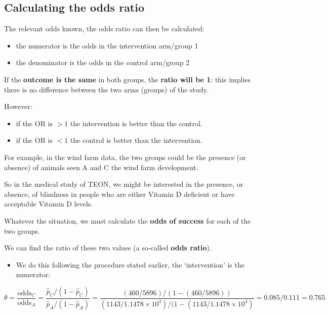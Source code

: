 \documentclass[
  oneside]{krantz}
\providecommand{\tightlist}{%
  \setlength{\itemsep}{0pt}\setlength{\parskip}{0pt}}
\begin{document}
\hypertarget{calculating-the-odds-ratio}{%
\subsection{Calculating the odds ratio}\label{calculating-the-odds-ratio}}

The relevant odds known, the odds ratio can then be calculated:

\begin{itemize}
\item
  the numerator is the odds in the intervention arm/group 1
\item
  the denominator is the odds in the control arm/group 2
\end{itemize}

If the \textbf{outcome is the same} in both groups, the \textbf{ratio will be 1}: this implies there is no difference between the two arms (groups) of the study.

However:

\begin{itemize}
\item
  if the OR is \(> 1\) the intervention is better than the control.
\item
  if the OR is \(< 1\) the control is better than the intervention.
\end{itemize}

For example, in the wind farm data, the two groups could be the presence (or absence) of animals seen A and C the wind farm development.

So in the medical study of TEON, we might be interested in the presence, or absence, of blindness in people who are either Vitamin D deficient or have acceptable Vitamin D levels.

Whatever the situation, we must calculate the \textbf{odds of success} for each of the two groups.

We can find the ratio of these two values (a so-called \textbf{odds ratio}).

\begin{itemize}
\tightlist
\item
  We do this following the procedure stated earlier, the `intervention' is the numerator:
\end{itemize}

\[\theta=\frac{\text{odds}_C}{\text{odds}_A}=\frac{\hat{p}_C/(1-\hat{p}_C)}{\hat{p}_A/(1-\hat{p}_A)}=\frac{(460 / 5896) / (1-(460/ 5896))}{(1143 / \ensuremath{1.1478\times 10^{4}}) / (1-(1143 / \ensuremath{1.1478\times 10^{4}})}= 0.085/ 0.111= 0.765\]
\end{document}
